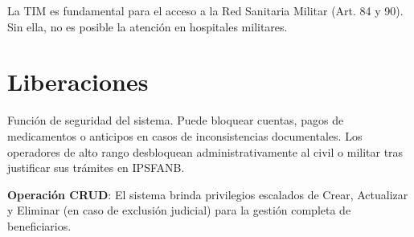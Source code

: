La TIM es fundamental para el acceso a la Red Sanitaria Militar (Art. 84 y 90). Sin ella, no es posible la atención en hospitales militares.

\section{Liberaciones}

Función de seguridad del sistema. Puede bloquear cuentas, pagos de medicamentos o anticipos en casos de inconsistencias documentales. Los operadores de alto rango desbloquean administrativamente al civil o militar tras justificar sus trámites en IPSFANB.

\begin{tcolorbox}[
    colback=sandraSoft,
    colframe=sandraDark,
    width=0.9\textwidth,
    halign=center
]
\small
\textbf{Operación CRUD}: El sistema brinda privilegios escalados de Crear, Actualizar y Eliminar (en caso de exclusión judicial) para la gestión completa de beneficiarios.
\end{tcolorbox}

\newpage
